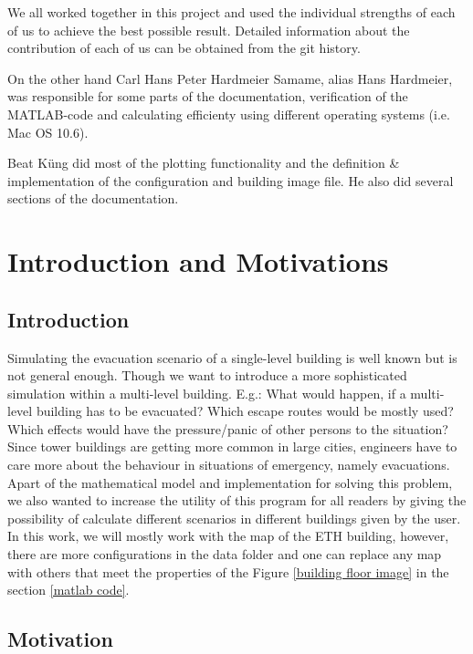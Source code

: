 \documentclass[11pt]{article}
\begin{document}
We all worked together in this project and used the individual strengths of each
of us to achieve the best possible result. Detailed information about the
contribution of each of us can be obtained from the git history.

On the other hand Carl Hans Peter Hardmeier Samame, alias Hans Hardmeier, was responsible for some parts of the documentation, verification of the MATLAB-code and calculating efficienty using different operating systems (i.e. Mac OS 10.6).



Beat K\"ung did most of the plotting functionality and the definition \&
implementation of the configuration and building image file. He also did several
sections of the documentation.




\section{Introduction and Motivations}

\subsection{Introduction}

Simulating the evacuation scenario of a single-level building is well known but
is not general enough. Though we want to introduce a more sophisticated
simulation within a multi-level building. E.g.: What would happen, if a
multi-level building has to be evacuated? Which escape routes would be mostly
used? Which effects would have the pressure/panic of other persons to the
situation? Since tower buildings are getting more common in large cities,
engineers have to care more about the behaviour in situations of emergency,
namely evacuations. Apart of the mathematical model and implementation for
solving this problem, we also wanted to increase the utility of this program for
all readers by giving the possibility of calculate different scenarios in
different buildings given by the user. In this work, we will mostly work with
the map of the ETH building, however, there are more configurations in the data
folder and one can replace any map with others that meet the properties of the
Figure \ref{building floor image} in the section \ref{matlab code}.

\subsection{Motivation}
\end{document}

